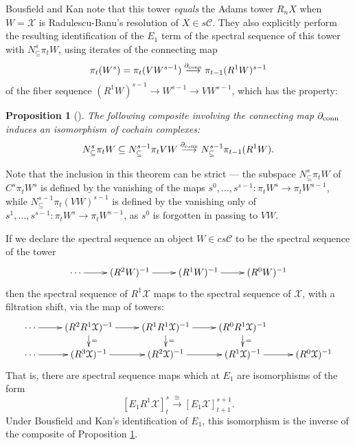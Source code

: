 \documentclass[11pt]{amsart} \renewcommand{\baselinestretch}{1.4}
\theoremstyle{plain}
\newtheorem{prop}[thm]{Proposition}
\theoremstyle{definition}
\renewcommand{\to}{\longrightarrow}
\newcommand{\calT}{\mathcal{T}}
\newcommand{\calK}{\mathcal{K}}
\newcommand{\calx}{\mathcal{X}}
\newcommand{\calc}{\mathcal{C}}
\newcommand{\citeBOX}[2][]{\cite[\mbox{#1}]{#2}}
\newcommand{\algcat}{{\calc}}%
\newcommand{\Edownup}[5]{[E_{#1}^{#2}#3]^{#4}_{#5}}
\newcommand{\Dendo}{R}
\begin{document}
\begin{Operations on the Bousfield-Kan spectral sequence}
Bousfield and Kan note \citeBOX[\S3.3 and \S4.2]{BK_pairings_products.pdf} that this tower \emph{equals} the Adams tower $R_nX$ when $W=\calx$ is Radulescu-Banu's resolution of $X\in s\algcat$. They also explicitly perform the resulting identification of the $E_1$ term of the spectral sequence of this tower with $N^s_\subseteq\pi_tW$, using iterates of the connecting map
\[\pi_t(W^{s})=\pi_t(VW^{s-1})\overset{\partial_\textup{conn} }{\to}\pi_{t-1}(\Dendo^1W)^{s-1}\]
of the fiber sequence $(\Dendo^1W)^{s-1}\to W^{s-1}\to VW^{s-1}$, which has the property:
\begin{prop}[{\cite[Proposition 5.2]{BK_pairings_products.pdf}}]
\label{BK D1 is awesome}
The following composite involving the connecting map $\partial_\textup{conn}$ induces an isomorphism of cochain complexes:
\[N^s_\subseteq \pi_t W\subseteq N^{s-1}_\subseteq \pi_t VW \overset{\partial_\textup{conn}}{\to}N^{s-1}_\subseteq \pi_{t-1} (\Dendo^1W).\]
\end{prop}
\noindent Note that the inclusion in this theorem can be strict --- the subspace $N^s_\subseteq \pi_t W$ of $C^s\pi_t W^s$ is defined by the vanishing of the maps $s^0,\ldots,s^{s-1}:\pi_t W^s\to \pi_t W^{s-1}$, while $ N^{s-1}_\subseteq \pi_t (VW)^{s-1}$ is defined by the vanishing only of $s^1,\ldots,s^{s-1}:\pi_t W^s\to \pi_t W^{s-1}$, as $s^0$ is forgotten in passing to $VW$.

If we declare the spectral sequence an object $W\in cs\algcat$ to be the spectral sequence of the tower
\[\xymatrix@R=4mm{
\cdots 
\ar[r]
&%
(\Dendo^2W)^{-1}
\ar[r]
&%
(\Dendo^1W)^{-1}
\ar[r]&%
(\Dendo^0W)^{-1}
}\]
then the spectral sequence of $\Dendo^1\calx$ maps to the spectral sequence of $\calx$, with a filtration shift, via the map of towers:
\[\xymatrix@R=4mm{
\cdots 
\ar[r]
&%
(\Dendo^2\Dendo^1\calx)^{-1}
\ar[r]\ar[d]^{=}
&%
(\Dendo^1\Dendo^1\calx)^{-1}
\ar[r]\ar[d]^{=}
&%
(\Dendo^0\Dendo^1\calx)^{-1}
\ar[d]^{=}
\\
\cdots 
\ar[r]
&%
(\Dendo^3\calx)^{-1}
\ar[r]
&%
(\Dendo^2\calx)^{-1}
\ar[r]
&%
(\Dendo^1\calx)^{-1}
\ar[r]&%
(\Dendo^0\calx)^{-1}
}\]
That is, there are spectral sequence maps which at $E_1$ are isomorphisms  of the form
\[\Edownup{1}{}{\Dendo^1\calx}{s}{t}\overset{\cong}{\to} \Edownup{1}{}{\calx}{s+1}{t+1}.\]
Under Bousfield and Kan's identification of $E_1$, this isomorphism is the inverse of the composite of Proposition \ref{BK D1 is awesome}.


\end{Operations on the Bousfield-Kan spectral sequence}
\end{document}
